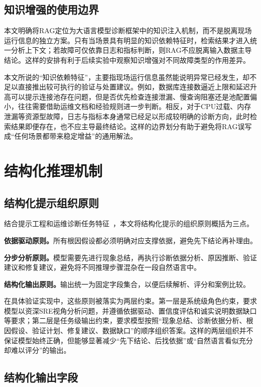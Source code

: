 \subsection{知识增强的使用边界}

本文明确将RAG定位为大语言模型诊断框架中的知识注入机制，而不是脱离现场运行信息的独立方案。只有当场景具有明显的知识依赖特征时，检索结果才进入统一分析上下文；若故障可仅依靠日志和指标判断，则RAG不应脱离输入数据主导结论。这样的安排有利于后续实验中观察知识增强对不同故障类型的作用差异。

本文所说的“知识依赖特征”，主要指现场运行信息虽然能说明异常已经发生，却不足以直接推出较可执行的验证与处置建议。例如，数据库连接数逼近上限和延迟升高可以提示连接池存在问题，但是否优先检查连接泄漏、慢查询阻塞还是池配置偏小，往往需要借助运维文档和经验规则进一步判断。相反，对于CPU过载、内存泄漏等资源型故障，日志与指标本身通常已经足以形成较明确的诊断方向，此时检索结果即便存在，也不应主导最终结论。这样的边界划分有助于避免将RAG误写成“任何场景都带来稳定增益”的通用解法。

\section{结构化推理机制}

\subsection{结构化提示组织原则}

结合提示工程和运维诊断任务特征~\cite{liu2023prompt,wei2022cot,wang2023planandsolve}，本文将结构化提示的组织原则概括为三点。

\textbf{依据驱动原则。}所有根因假设都必须明确对应支撑依据，避免先下结论再补理由。

\textbf{分步分析原则。}模型需要先进行现象总结，再执行诊断依据分析、原因推断、验证建议和修复建议，避免将不同推理步骤混杂在一段自然语言中。

\textbf{结构化输出原则。}输出统一为固定字段集合，以便后续解析、评分和案例比较。

在具体验证实现中，这些原则被落实为两层约束。第一层是系统级角色约束，要求模型以资深SRE视角分析问题，并遵循依据驱动、置信度评估和诚实说明数据缺口等要求；第二层是任务级输出约束，要求模型按照“现象总结、诊断依据分析、根因假设、验证计划、修复建议、数据缺口”的顺序组织答案。这样的两层组织并不保证模型始终正确，但能够显著减少“先下结论、后找依据”或“自然语言看似充分却难以评分”的输出。

\subsection{结构化输出字段}

